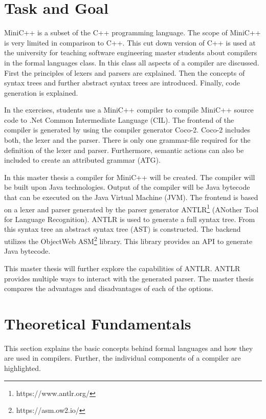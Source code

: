 \section{Task and Goal}

MiniC++ is a subset of the C++ programming language. The scope of MiniC++ is very limited in comparison to C++. This cut down version of C++ is used at the university for teaching software engineering master students about compilers in the formal languages class. In this class all aspects of a compiler are discussed. First the principles of lexers and parsers are explained. Then the concepts of syntax trees and further abstract syntax trees are introduced. Finally, code generation is explained. 

In the exercises, students use a MiniC++ compiler to compile MiniC++ source code to .Net Common Intermediate Language (CIL). The frontend of the compiler is generated by using the compiler generator Coco-2. Coco-2 includes both, the lexer and the parser. There is only one grammar-file required for the definition of the lexer and parser. Furthermore, semantic actions can also be included to create an attributed grammar (ATG). 

In this master thesis a compiler for MiniC++ will be created. The compiler will be built upon Java technologies. Output of the compiler will be Java bytecode that can be executed on the Java Virtual Machine (JVM). The frontend is based on a lexer and parser generated by the parser generator ANTLR\footnote{https://www.antlr.org/} (ANother Tool for Language Recognition). ANTLR is used to generate a full syntax tree. From this syntax tree an abstract syntax tree (AST) is constructed. The backend utilizes the ObjectWeb ASM\footnote{https://asm.ow2.io/} library. This library provides an API to generate Java bytecode. 

This master thesis will further explore the capabilities of ANTLR. ANTLR provides multiple ways to interact with the generated parser. The master thesis compares the advantages and disadvantages of each of the options.

\section{Theoretical Fundamentals}

This section explains the basic concepts behind formal languages and how they are used in compilers. Further, the individual components of a compiler are highlighted. 

